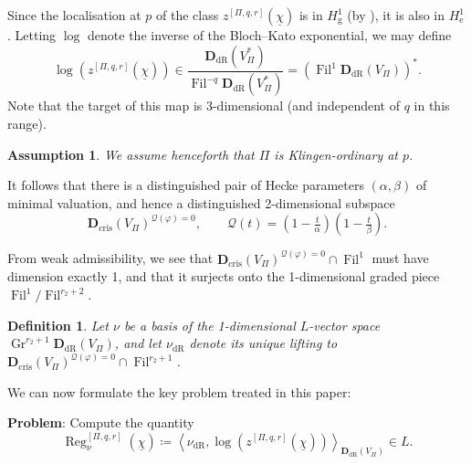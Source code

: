 \documentclass[cjm]{ipart}
\theoremstyle{plain}
\newtheorem{definition}[theorem]{Definition}
\newtheorem{assumption}[theorem]{Assumption}
\theoremstyle{remark}
\DeclareMathOperator{\Fil}{Fil}
\DeclareMathOperator{\Gr}{Gr}
\newcommand{\Dcris}{\mathbf{D}_{\mathrm{cris}}}
\newcommand{\DdR}{\mathbf{D}_{\mathrm{dR}}}
\newcommand{\cQ}{\mathcal{Q}}
\newcommand{\dR}{\mathrm{dR}}
\newcommand{\uchi}{\underline{\chi}}
\numberwithin{equation}{subsection}
\begin{document}
  Since the localisation at $p$ of the class $ z^{[\Pi, q, r]}(\uchi)$ is in $H^1_{\mathrm{g}}$ (by \cite[Theorem B]{nekovarniziol16}), it is also in $H^1_{\mathrm{e}}$. Letting $\log$ denote the inverse of the Bloch--Kato exponential, we may define
  \[ \log\left(  z^{[\Pi, q, r]}(\uchi) \right) \in \frac{\DdR(V_\Pi^*)}{\Fil^{-q} \DdR(V_\Pi^*)} = \left(\Fil^1 \DdR(V_\Pi) \right)^*.\]
  Note that the target of this map is 3-dimensional (and independent of $q$ in this range).

  \begin{assumption}
   We assume henceforth that $\Pi$ is Klingen-ordinary at $p$.
  \end{assumption}

  It follows that there is a distinguished pair of Hecke parameters $(\alpha, \beta)$ of minimal valuation, and hence a distinguished 2-dimensional subspace
  \begin{equation} \label{eq:defcurlyP}
   \Dcris(V_\Pi)^{\cQ(\varphi) = 0}, \qquad \cQ(t) = (1 - \tfrac{t}{\alpha})(1 - \tfrac{t}{\beta}).
  \end{equation}

  \begin{note}\label{note:1diml}
   From weak admissibility, we see that $\Dcris(V_\Pi)^{\cQ(\varphi) = 0} \cap \Fil^1$ must have dimension exactly 1, and that it surjects onto the 1-dimensional graded piece $\Fil^1 / \Fil^{r_2 + 2}$.
  \end{note}

  \begin{definition}
   \label{def:nudR}
   Let $\nu$ be a basis of the 1-dimensional $L$-vector space $\Gr^{r_2 + 1} \DdR(V_\Pi)$, and let $\nu_{\dR}$ denote its unique lifting to $\Dcris(V_\Pi)^{\cQ(\varphi) = 0} \cap \Fil^{r_2 + 1}$.
  \end{definition}

  We can now formulate the key problem treated in this paper:
  \bigskip
  \begin{mdframed}
   \textbf{Problem}: Compute the quantity
   \begin{equation}
    \label{eq:goal0}
    \operatorname{Reg}_{\nu}^{[\Pi, q, r]}(\uchi) \coloneqq \left\langle \nu_{\dR}, \log\left( z^{[\Pi, q, r]}(\uchi) \right)\right\rangle_{\DdR(V_\Pi)} \in L.
   \end{equation}
  \end{mdframed}
  \bigskip
\end{document}
